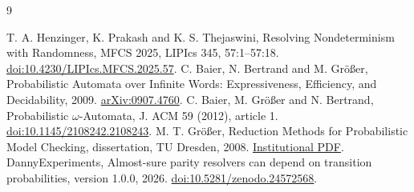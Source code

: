 \documentclass[11pt]{amsart}
\begin{document}
\begin{thebibliography}{9}
\raggedright
{} T. A. Henzinger, K. Prakash and K. S. Thejaswini, Resolving Nondeterminism with Randomness, MFCS 2025, LIPIcs 345, 57:1--57:18. \href{https://doi.org/10.4230/LIPIcs.MFCS.2025.57}{doi:10.4230/LIPIcs.MFCS.2025.57}.
 C. Baier, N. Bertrand and M. Gr\"o{\ss}er, Probabilistic Automata over Infinite Words: Expressiveness, Efficiency, and Decidability, 2009. \href{https://arxiv.org/abs/0907.4760}{arXiv:0907.4760}.
 C. Baier, M. Gr\"o{\ss}er and N. Bertrand, Probabilistic \(\omega\)-Automata, J. ACM 59 (2012), article 1. \href{https://doi.org/10.1145/2108242.2108243}{doi:10.1145/2108242.2108243}.
 M. T. Gr\"o{\ss}er, Reduction Methods for Probabilistic Model Checking, dissertation, TU Dresden, 2008. \href{https://wwwtcs.inf.tu-dresden.de/ALGI/PUB/thesis_groesser.pdf}{Institutional PDF}.
 DannyExperiments, Almost-sure parity resolvers can depend on transition probabilities, version 1.0.0, 2026. \href{https://doi.org/10.5281/zenodo.24572568}{doi:10.5281/zenodo.24572568}.
\end{thebibliography}
\end{document}
